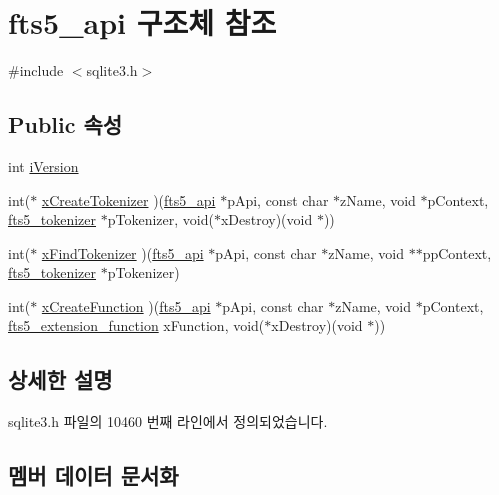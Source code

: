 \hypertarget{structfts5__api}{}\section{fts5\+\_\+api 구조체 참조}
\label{structfts5__api}


{\ttfamily \#include $<$sqlite3.\+h$>$}

\subsection*{Public 속성}
\begin{DoxyCompactItemize}
\item 
int \hyperlink{structfts5__api_a3c338289abb33e1805da870172956a7c}{i\+Version}
\item 
int($\ast$ \hyperlink{structfts5__api_a7fe3663f85eab512d5c461e1674da129}{x\+Create\+Tokenizer} )(\hyperlink{structfts5__api}{fts5\+\_\+api} $\ast$p\+Api, const char $\ast$z\+Name, void $\ast$p\+Context, \hyperlink{structfts5__tokenizer}{fts5\+\_\+tokenizer} $\ast$p\+Tokenizer, void($\ast$x\+Destroy)(void $\ast$))
\item 
int($\ast$ \hyperlink{structfts5__api_a20a23794695fa61e2892ad1243b16b67}{x\+Find\+Tokenizer} )(\hyperlink{structfts5__api}{fts5\+\_\+api} $\ast$p\+Api, const char $\ast$z\+Name, void $\ast$$\ast$pp\+Context, \hyperlink{structfts5__tokenizer}{fts5\+\_\+tokenizer} $\ast$p\+Tokenizer)
\item 
int($\ast$ \hyperlink{structfts5__api_acf1a0612be3b91b908f38ecbc6735d17}{x\+Create\+Function} )(\hyperlink{structfts5__api}{fts5\+\_\+api} $\ast$p\+Api, const char $\ast$z\+Name, void $\ast$p\+Context, \hyperlink{sqlite3_8h_a8a1df7b5a066b194f490be5936e85c17}{fts5\+\_\+extension\+\_\+function} x\+Function, void($\ast$x\+Destroy)(void $\ast$))
\end{DoxyCompactItemize}


\subsection{상세한 설명}


sqlite3.\+h 파일의 10460 번째 라인에서 정의되었습니다.



\subsection{멤버 데이터 문서화}
\mbox{\label{structfts5__api_a3c338289abb33e1805da870172956a7c}} 
